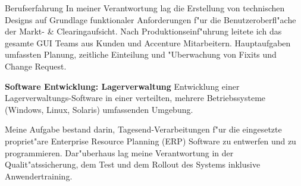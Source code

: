 \begin{rubric}{Berufserfahrung}
In meiner Verantwortung lag die Erstellung von technischen Designs auf Grundlage funktionaler Anforderungen f"ur die Benutzeroberfl"ache der Markt- \& Clearingaufsicht. Nach Produktionseinf"uhrung leitete ich das gesamte GUI Teams aus Kunden und Accenture Mitarbeitern. Hauptaufgaben umfassten Planung, zeitliche Einteilung und "Uberwachung von Fixits und Change Request. 


\entry*[01/2001 - 10/2001] \textbf{Software Entwicklung: Lagerverwaltung}\newline
{} 
Entwicklung einer Lagerverwaltungs-Software in einer verteilten, mehrere Betriebs\-systeme (Windows, Linux, Solaris) umfassenden Umgebung.\axelvspace

Meine Aufgabe bestand darin, Tagesend-Verarbeitungen f"ur die eingesetzte propriet"are Enterprise Resource Planning (ERP) Software zu entwerfen und zu programmieren. Dar"uberhaus lag meine Verantwortung in der Qualit"atssicherung, dem Test und dem Rollout des Systems inklusive Anwendertraining.


\end{rubric}
